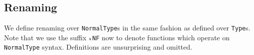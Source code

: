 \documentclass[authoryear, acmsmall, screen, review, nonacm]{acmart}
\begin{document}
\begin{code}
\<%
\\
%
\>[4]\AgdaSpace{}%
\AgdaSpace{}%
\<%
\\
%
\\[\AgdaEmptyExtraSkip]%
%
\>[2]%
\>[6]\AgdaSymbol{:}\<%
\\
\>[2][@{}l@{\AgdaIndent{0}}]%
\>[4]\AgdaSymbol{(}\AgdaSpace{}%
\AgdaSymbol{:}\AgdaSpace{}%
\AgdaSpace{}%
\AgdaSpace{}%
\AgdaOperator{\AgdaInductiveConstructor{R[}}\AgdaSpace{}%
\AgdaSpace{}%
\AgdaOperator{\AgdaInductiveConstructor{]}}\AgdaSymbol{)}\AgdaSpace{}%
\<%
\\
%
\>[4]\AgdaSpace{}%
\AgdaSpace{}%
\<%
\end{code}

\subsection{Renaming}
We define renaming over \verb!NormalType!s in the same fashion as defined over \verb!Type!s. Note that we use the suffix \verb!ₖNF! now to denote functions which operate on \verb!NormalType! syntax. Definitions are unsurprising and omitted.
\end{document}

